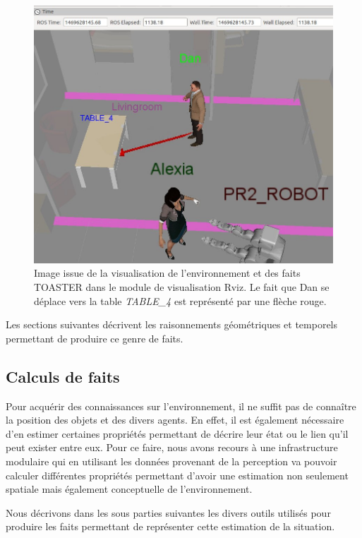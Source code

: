 \documentclass[a4paper,11pt,twoside]{StyleThese}
\begin{document}
\begin{figure}[ht!]
 \centering
  \includegraphics[width=0.99\linewidth]{./img/towardTbl.jpg} 
  \caption {Image issue de la visualisation de l'environnement et des faits TOASTER dans le module de visualisation Rviz. Le fait que Dan se déplace vers la table \textit{TABLE\_4} est représenté par une flèche rouge.}
  \label{fig:fact}
\end{figure}

Les sections suivantes décrivent les raisonnements géométriques et temporels 
permettant de produire ce genre de faits.

\subsection{Calculs de faits}

Pour acquérir des connaissances sur l'environnement, il ne suffit pas de connaître la position des objets et des divers agents. En effet, il est également nécessaire d'en estimer certaines propriétés permettant de décrire leur état ou le lien qu'il peut exister entre eux. Pour ce faire, nous avons recours à une infrastructure modulaire qui en utilisant les données provenant de la perception va pouvoir calculer différentes propriétés permettant d'avoir une estimation non seulement spatiale mais également conceptuelle de l'environnement.

Nous décrivons dans les sous parties suivantes les divers outils utilisés pour produire les faits permettant de représenter cette estimation de la situation.
\end{document}

